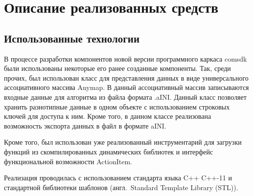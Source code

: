 \chapter{Описание реализованных средств}\label{chap4_soft_testing}
\section{Использованные технологии}\label{sec:used_tech}
В процессе разработки компонентов новой версии программного каркаса comsdk были использованы некоторые его ранее созданные компоненты. Так, среди прочих, был использован класс для представления данных в виде универсального ассоциативного массива \textsf{Anymap}. В данный ассоциативный массив записываются входные данные для алгоритма из файла формата .aINI\cite{SokAINI}. Данный класс позволяет хранить разнотипные данные в одном объекте с использованием строковых ключей для доступа к ним. Кроме того, в данном классе реализована возможность экспорта данных в файл в формате aINI.

Кроме того, был использован уже реализованный инструментарий для загрузки функций из скомпилированных динамических библиотек и интерфейс функциональной возможности \textsf{ActionItem}.

Реализация проводилась с использованием стандарта языка C++ C++-11 и стандартной библиотеки шаблонов (англ.~Standard Template Library (STL)).

